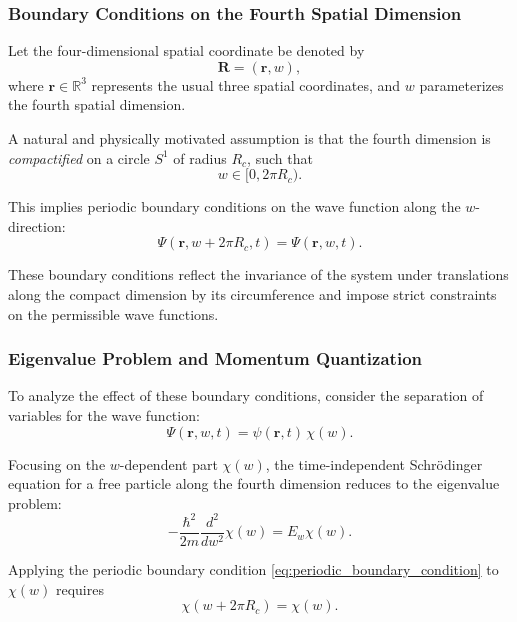 \documentclass[12pt]{article}
\begin{document}
\subsubsection*{Boundary Conditions on the Fourth Spatial Dimension}

Let the four-dimensional spatial coordinate be denoted by
\begin{equation}
    \mathbf{R} = (\mathbf{r}, w),
\end{equation}
where \(\mathbf{r} \in \mathbb{R}^3\) represents the usual three spatial coordinates, and \(w\) parameterizes the fourth spatial dimension.

A natural and physically motivated assumption is that the fourth dimension is \emph{compactified} on a circle \(S^1\) of radius \(R_c\), such that
\begin{equation}
    w \in [0, 2 \pi R_c).
\end{equation}

This implies periodic boundary conditions on the wave function along the \(w\)-direction:
\begin{equation}
    \Psi(\mathbf{r}, w + 2 \pi R_c, t) = \Psi(\mathbf{r}, w, t).
    \label{eq:periodic_boundary_condition}
\end{equation}

These boundary conditions reflect the invariance of the system under translations along the compact dimension by its circumference and impose strict constraints on the permissible wave functions.

\subsubsection*{Eigenvalue Problem and Momentum Quantization}

To analyze the effect of these boundary conditions, consider the separation of variables for the wave function:
\begin{equation}
    \Psi(\mathbf{r}, w, t) = \psi(\mathbf{r}, t) \, \chi(w).
\end{equation}

Focusing on the \(w\)-dependent part \(\chi(w)\), the time-independent Schrödinger equation for a free particle along the fourth dimension reduces to the eigenvalue problem:
\begin{equation}
    - \frac{\hbar^2}{2m} \frac{d^2}{dw^2} \chi(w) = E_w \chi(w).
    \label{eq:4d_schrodinger_w}
\end{equation}

Applying the periodic boundary condition \eqref{eq:periodic_boundary_condition} to \(\chi(w)\) requires
\begin{equation}
    \chi(w + 2 \pi R_c) = \chi(w).
\end{equation}
\end{document}
